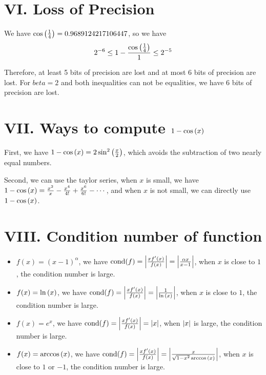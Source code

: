\documentclass[a4paper]{article}
\begin{document}
\section*{VI. Loss of Precision}

We have $\cos\qty(\frac{1}{4}) = 0.9689124217106447$, so we have
\begin{equation}
   2^{-6} \leq 1 - \frac{\cos\qty(\frac{1}{4})}{1} \leq 2^{-5}
\end{equation}

Therefore, at least 5 bits of precision are lost and at most 6 bits of precision are lost. For $beta=2$ and both inequalities can not be equalities, we have $6$ bits of precision are lost.

\section*{VII. Ways to compute $1-\cos\qty(x)$}

First, we have $1-\cos\qty(x) = 2\sin^2\qty(\frac{x}{2})$, which avoids the subtraction of two nearly equal numbers.

Second, we can use the taylor series, when $x$ is small, we have $1-\cos\qty(x) = \frac{x^2}{x} - \frac{x^4}{4!} + \frac{x^6}{6!} - \cdots$, and when $x$ is not small, we can directly use $1-\cos\qty(x)$.


\section*{VIII. Condition number of function}

\begin{itemize}
    \item $f(x) = (x-1)^{\alpha}$, we have $\mathrm{cond}(f) = \abs{\frac{x f^\prime(x)}{f(x)}} = \abs{\frac{\alpha x}{x-1}}$, when $x$ is close to $1$, the condition number is large.
    \item $f(x) = \ln\qty(x)$, we have $\mathrm{cond}(f) = \abs{\frac{x f^\prime(x)}{f(x)}} = \abs{\frac{1}{\ln\qty(x)}}$, when $x$ is close to $1$, the condition number is large.
    \item $f(x) = e^x$, we have $\mathrm{cond}(f) = \abs{\frac{x f^\prime(x)}{f(x)}} = \abs{x}$, when $\abs{x}$ is large, the condition number is large.
    \item $f(x) = \arccos\qty(x)$, we have $\mathrm{cond}(f) = \abs{\frac{x f^\prime(x)}{f(x)}} = \abs{\frac{x}{\sqrt{1-x^2} \arccos\qty(x)}}$, when $x$ is close to $1$ or $-1$, the condition number is large.
\end{itemize}
\end{document}
